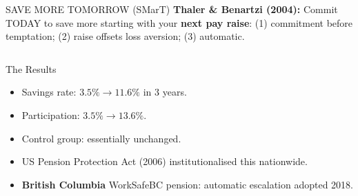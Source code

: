 \documentclass[aspectratio=169]{beamer}
\begin{document}
\begin{frame}{SAVE MORE TOMORROW (SMarT)}
\textcolor{beblue}{\textbf{Thaler \& Benartzi (2004):}} Commit TODAY to save more starting with your \textbf{next pay raise}: (1) commitment before temptation; (2) raise offsets loss aversion; (3) automatic.
\begin{columns}
\begin{exampleblock}{The Results}
\begin{itemize}
  \item Savings rate: $3.5\% \to 11.6\%$ in 3 years.
  \item Participation: $3.5\% \to 13.6\%$.
  \item Control group: essentially unchanged.
  \item US Pension Protection Act (2006) institutionalised this nationwide.
  \item \textbf{British Columbia} WorkSafeBC pension: automatic escalation adopted 2018.
\end{itemize}
\end{exampleblock}
\end{columns}
\end{frame}
\end{document}
